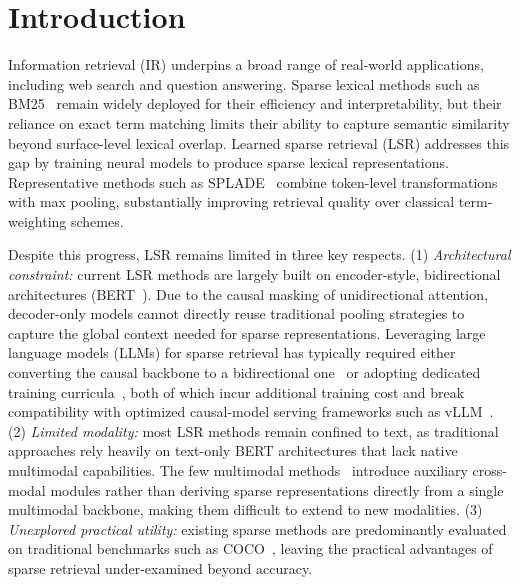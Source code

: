 

\section{Introduction}
\label{sec:intro}

Information retrieval (IR) underpins a broad range of real-world applications, including web search and question answering. 
Sparse lexical methods such as BM25~\citep{bm25} remain widely deployed for their efficiency and interpretability, but their reliance on exact term matching limits their ability to capture semantic similarity beyond surface-level lexical overlap.
Learned sparse retrieval (LSR) addresses this gap by training neural models to produce sparse lexical representations.
Representative methods such as SPLADE~\citep{spladev1, spladev2, spladepp} combine token-level transformations with max pooling, substantially improving retrieval quality over classical term-weighting schemes.

Despite this progress, LSR remains limited in three key respects.
(1) \emph{Architectural constraint:} current LSR methods are largely built on encoder-style, bidirectional architectures (\eg BERT~\citep{bert}). Due to the causal masking of unidirectional attention, decoder-only models cannot directly reuse traditional pooling strategies to capture the global context needed for sparse representations. 
Leveraging large language models (LLMs) for sparse retrieval has typically required either converting the causal backbone to a bidirectional one~\citep{bgem3} or adopting dedicated training curricula~\citep{laconic}, both of which incur additional training cost and break compatibility with optimized causal-model serving frameworks such as vLLM~\citep{vllm}.  
(2) \emph{Limited modality:} most LSR methods remain confined to text, as traditional approaches rely heavily on text-only BERT architectures that lack native multimodal capabilities. 
The few multimodal methods~\citep{visualsparta, stair} introduce auxiliary cross-modal modules rather than deriving sparse representations directly from a single multimodal backbone, making them difficult to extend to new modalities.
(3) \emph{Unexplored practical utility:} existing sparse methods are predominantly evaluated on traditional benchmarks such as COCO~\citep{coco}, leaving the practical advantages of sparse retrieval under-examined beyond accuracy. 

